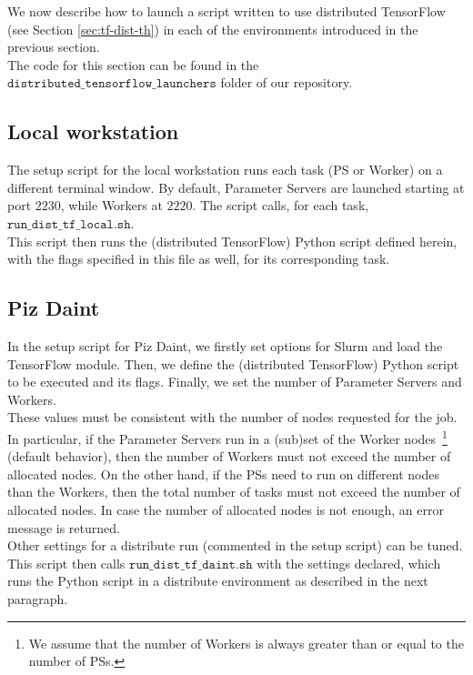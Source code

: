 We now describe how to launch a script written to use distributed TensorFlow (see Section \ref{sec:tf-dist-th}) in each of the environments introduced in the previous section.\\

The code for this section can be found in the $\texttt{distributed\_tensorflow\_launchers}$ folder of our repository.

\subsection{Local workstation}
The setup script for the local workstation runs each task (PS or Worker) on a different terminal window.
By default, Parameter Servers are launched starting at port $2230$, while Workers at $2220$.
The script calls, for each task, $\texttt{run\_dist\_tf\_local.sh}$.\\

This script then runs the (distributed TensorFlow) Python script defined herein, with the flags specified in this file as well, for its corresponding task.

\subsection{Piz Daint}
In the setup script for Piz Daint, we firstly set options for Slurm and load the TensorFlow module.
Then, we define the (distributed TensorFlow) Python script to be executed and its flags.
Finally, we set the number of Parameter Servers and Workers.\\
These values must be consistent with the number of nodes requested for the job.
In particular, if the Parameter Servers run in a (sub)set of the Worker nodes~\footnote{We assume that the number of Workers is always greater than or equal to the number of PSs.} (default behavior), then the number of Workers must not exceed the number of allocated nodes.
On the other hand, if the PSs need to run on different nodes than the Workers, then the total number of tasks must not exceed the number of allocated nodes.
In case the number of allocated nodes is not enough, an error message is returned.\\
Other settings for a distribute run (commented in the setup script) can be tuned.\\
This script then calls $\texttt{run\_dist\_tf\_daint.sh}$ with the settings declared, which runs the Python script in a distribute environment as described in the next paragraph.\\

